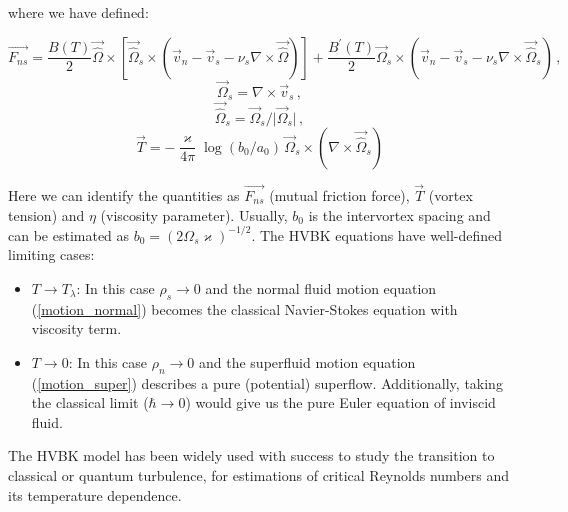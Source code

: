 where we have defined:

\begin{equation}
\vec{F_{ns}} = \frac{B(T)}{2} \vec{\hat{\Omega}} \times [\vec{\hat{\Omega}}_s \times (\vec{v}_n - \vec{v}_s - \nu_s\nabla \times \vec{\hat{\Omega}})]
+ \frac{B^{\prime}(T)}{2} \vec{\Omega}_s \times (\vec{v}_n - \vec{v}_s - \nu_s\nabla \times \vec{\hat{\Omega}}_s)\,,
\end{equation}
\begin{equation}
\vec{\Omega}_s = \nabla \times \vec{v}_s\,,
\end{equation}
\begin{equation}
\vec{\hat{\Omega}}_s = \vec{\Omega}_s / \vert \vec{\Omega}_s \vert\,,
\end{equation}
\begin{equation}
\vec{T} = - \frac{\varkappa}{4\pi} \log(b_0 / a_0) \, \vec{\Omega}_s \times (\nabla \times \vec{\hat{\Omega}}_s)
\end{equation}

Here we can identify the quantities as $\vec{F_{ns}}$ (mutual friction force), $\vec{T}$ (vortex tension) and $\eta$ (viscosity parameter). Usually, $b_0$ is the intervortex spacing and can be estimated as $b_0 = (2\Omega_s \varkappa)^{-1/2}$. %
The HVBK equations have well-defined limiting cases:

\begin{itemize}
	\item $T \rightarrow T_{\lambda}$: In this case $\rho_s \rightarrow 0$ and the normal fluid motion equation (\ref{motion_normal}) becomes the classical Navier-Stokes equation with viscosity term.

	\item $T \rightarrow 0$: In this case $\rho_n \rightarrow 0$ and the superfluid motion equation (\ref{motion_super}) describes a pure (potential) superflow. Additionally, taking the classical limit ($\hbar \rightarrow 0$) would give us the pure Euler equation of inviscid fluid.
\end{itemize}

The HVBK model has been widely used with success to study the transition to classical or quantum turbulence, for estimations of critical Reynolds numbers and its temperature dependence.

\newpage


